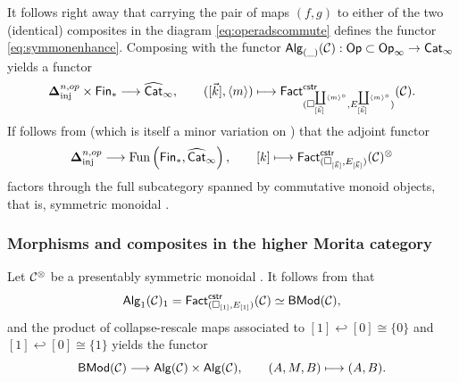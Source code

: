 \documentclass[10pt, reqno, twoside
, final
]{amsart}
\numberwithin{equation}{subsection}%
\theoremstyle{definition}
\theoremstyle{definition}
\theoremstyle{definition}
\theoremstyle{definition}
\theoremstyle{definition}
\theoremstyle{definition}
\theoremstyle{definition}
\theoremstyle{definition}
\theoremstyle{definition}
\theoremstyle{plain}
\theoremstyle{definition}
\theoremstyle{plain}
\theoremstyle{definition}
\theoremstyle{plain}
\theoremstyle{definition}
\theoremstyle{definition}
\theoremstyle{plain}
\theoremstyle{plain}
\theoremstyle{definition}
\theoremstyle{plain}
\theoremstyle{plain}
\theoremstyle{plain}
\begin{document}
It follows right away that carrying the pair of maps $(f,g)$ to either of the two (identical) composites in the diagram \eqref{eq:operadscommute} defines the functor \eqref{eq:symmonenhance}. Composing with the functor $\mathsf{Alg}_{(\_)}(\mathcal{C}):\mathsf{Op}\subset \mathsf{Op}_{\infty} \rightarrow \mathsf{Cat}_{\infty}$ yields a functor 
\[ \boldsymbol{\Delta}^{n,op}_{\mathrm{inj}}\times \mathsf{Fin}_*\longrightarrow \widehat{\mathsf{Cat}}_{\infty},\quad\quad ([\vec{k}],\langle m\rangle)\longmapsto \mathsf{Fact}^{\mathsf{cstr}}_{(\square_{[\vec{k}]}^{\coprod \langle m\rangle^{\circ}},E_{[\vec{k}]}^{\coprod \langle m\rangle^{\circ} })}(\mathcal{C}).\]
If follows from \cite[Proposition 5.11]{KS} (which is itself a minor variation on \cite[Corollary 6.2.3]{KSW}) that the adjoint functor 
\begin{equation}\label{eq:symmonenhance2}
    \boldsymbol{\Delta}^{n,op}_{\mathrm{inj}}\longrightarrow \mathrm{Fun}\left(\mathsf{Fin}_*,\widehat{\mathsf{Cat}}_{\infty}\right),\quad\quad [k]\longmapsto  \mathsf{Fact}^{\mathsf{cstr}}_{(\square_{[\vec{k}]},E_{[\vec{k}]})}(\mathcal{C})^{\otimes}
\end{equation}  
factors through the full subcategory spanned by commutative monoid objects, that is, symmetric monoidal \infcatst.


\subsubsection{Morphisms and composites in the higher Morita category}

Let $\mathcal{C}^{\otimes}$ be a presentably symmetric monoidal \infcatt. It follows from  that 
\[ \mathsf{Alg}_1(\mathcal{C})_1 = \mathsf{Fact}^{\mathsf{cstr}}_{(\square_{[1]},E_{[1]})}(\mathcal{C}) \simeq \mathsf{BMod}(\mathcal{C}),  \]
and the product of collapse-rescale maps associated to $[1]\hookleftarrow [0]\cong\{0\}$ and $[1]\hookleftarrow [0]\cong \{1\}$ yields the functor
\[ \mathsf{BMod}(\mathcal{C})\longrightarrow \mathsf{Alg}(\mathcal{C})\times\mathsf{Alg}(\mathcal{C}),\quad\quad (A,M,B)\longmapsto (A,B).  \]
\end{document}
